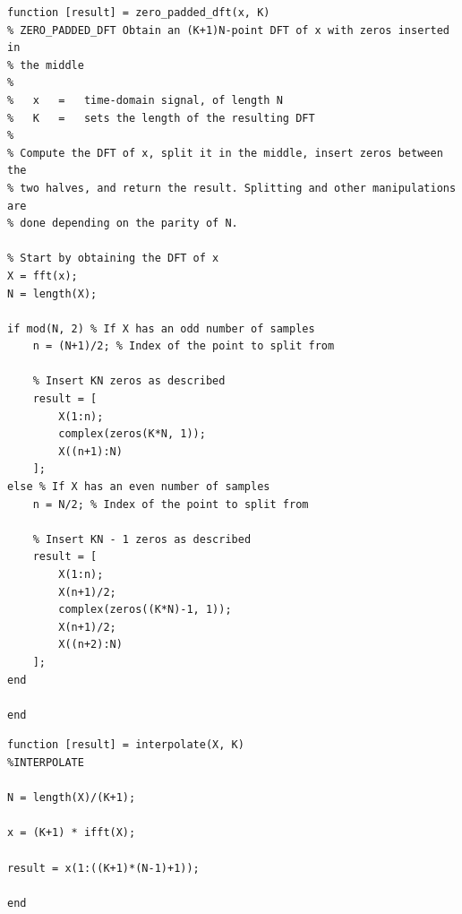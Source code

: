 \documentclass{article}[a4paper]
\begin{document}
	\begin{lstlisting}[caption={Zero-padding DFT}, label=zero_pad_dft_cod]
function [result] = zero_padded_dft(x, K)
% ZERO_PADDED_DFT Obtain an (K+1)N-point DFT of x with zeros inserted in
% the middle
% 
%   x   =   time-domain signal, of length N
%   K   =   sets the length of the resulting DFT
%
% Compute the DFT of x, split it in the middle, insert zeros between the
% two halves, and return the result. Splitting and other manipulations are
% done depending on the parity of N.

% Start by obtaining the DFT of x
X = fft(x);
N = length(X);

if mod(N, 2) % If X has an odd number of samples
	n = (N+1)/2; % Index of the point to split from
	
	% Insert KN zeros as described
	result = [
		X(1:n);
		complex(zeros(K*N, 1));
		X((n+1):N)
	];
else % If X has an even number of samples
	n = N/2; % Index of the point to split from
	
	% Insert KN - 1 zeros as described
	result = [
		X(1:n);
		X(n+1)/2;
		complex(zeros((K*N)-1, 1));
		X(n+1)/2;
		X((n+2):N)
	];
end

end
	\end{lstlisting}
	
	\begin{lstlisting}[caption={Interpolation}, label=interp_code]
function [result] = interpolate(X, K)
%INTERPOLATE

N = length(X)/(K+1);

x = (K+1) * ifft(X);

result = x(1:((K+1)*(N-1)+1));

end
	\end{lstlisting}
\end{document}
